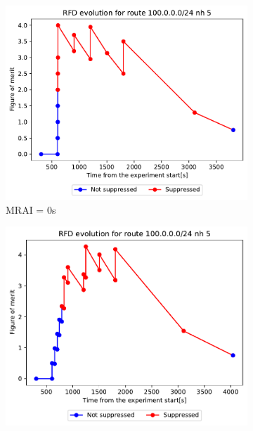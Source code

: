 \begin{figure}[h]
     \centering
     \begin{subfigure}[b]{0.49\textwidth}
         \centering
         \includegraphics[width=\textwidth]{images/RFD/clique/FigureOfMerit/mrai1_RFD_x_rfd_R1.pdf}
         \caption{MRAI = 0s}
         \label{fig:clique_x_mrai0}
     \end{subfigure}
     \hfill
     \begin{subfigure}[b]{0.49\textwidth}
         \centering
         \includegraphics[width=\textwidth]{images/RFD/clique/FigureOfMerit/mrai11_RFD_x_rfd_R1.pdf}

\end{subfigure}
\end{figure}

